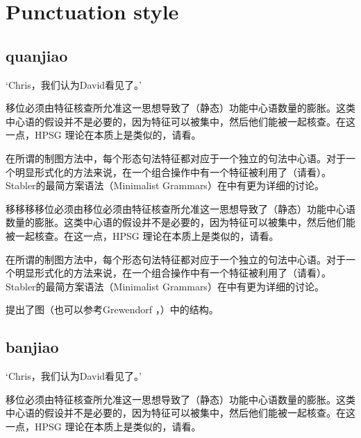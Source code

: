 \documentclass{scrbook}
\let\citew\citealp
\newcommand{\page}{}
\begin{document}
\chapter{Punctuation style}

\section{quanjiao}


    `Chris，我们认为David看见了。'

移位必须由特征核查所允准这一思想导致了（静态）功能中心语数量的膨胀。这类中心语的假设并不是必要的，因为特征可以被集中，然后他们能被一起核查。在这一点，HPSG 理论在本质上是类似的，请看\citew[\S~II.3.3.4, \S~II.4.2]{Sternefeld2006a-u}。

在所谓的制图方法中，每个形态句法特征都对应于一个独立的句法中心语\citep[\page 54, 61]{CR2010a}。对于一个明显形式化的方法来说，在一个组合操作中有一个特征被利用了（请看\citew[\page 335]{Stabler2001a}）。Stabler的最简方案语法（Minimalist Grammars）在中有更为详细的讨论。

移移移移位必须由移位必须由特征核查所允准这一思想导致了（静态）功能中心语数量的膨胀。这类中心语的假设并不是必要的，因为特征可以被集中，然后他们能被一起核查。在这一点，HPSG 理论在本质上是类似的，请看\citew[\S~II.3.3.4, \S~II.4.2]{Sternefeld2006a-u}。

在所谓的制图方法中，每个形态句法特征都对应于一个独立的句法中心语\citep[\page 54, 61]{CR2010a}。对于一个明显形式化的方法来说，在一个组合操作中有一个特征被利用了（请看\citew[\page 335]{Stabler2001a}）。Stabler的最简方案语法（Minimalist Grammars）在中有更为详细的讨论。

\citet[\page 297]{Rizzi97a-u}提出了图（也可以参考Grewendorf \citeyear[\page 85, 240]{Grewendorf2002a}，\citeyear{Grewendorf2009a}）中的结构。


\section{banjiao}



    `Chris，我们认为David看见了。'

移位必须由特征核查所允准这一思想导致了（静态）功能中心语数量的膨胀。这类中心语的假设并不是必要的，因为特征可以被集中，然后他们能被一起核查。在这一点，HPSG 理论在本质上是类似的，请看\citew[\S~II.3.3.4, \S~II.4.2]{Sternefeld2006a-u}。
\end{document}
